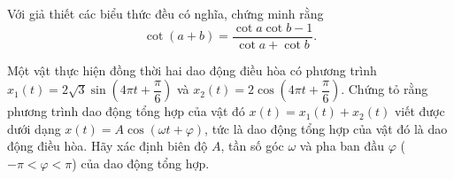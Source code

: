 \begin{bt}[VDT]%
	Với giả thiết các biểu thức đều có nghĩa, chứng minh rằng
	$$\cot (a+b) = \dfrac{\cot a \cot b -1}{\cot a + \cot b}.$$
\end{bt}
\begin{bt}%
	Một vật thực hiện đồng thời hai dao động điều hòa có phương trình $x_1(t) =2\sqrt{3} \sin \left(4\pi t+\dfrac{\pi}{6}\right)$ và $x_2(t) = 2\cos \left(4\pi t+\dfrac{\pi}{6}\right)$. Chứng tỏ rằng phương trình dao động tổng hợp của vật đó $x(t) = x_1(t)+x_2(t)$ viết được dưới dạng $x(t) = A\cos (\omega t + \varphi)$, tức là dao động tổng hợp của vật đó là dao động điều hòa. Hãy xác định biên độ $A$, tần số góc $\omega$ và pha ban đầu $\varphi$ ($-\pi<\varphi<\pi$) của dao động tổng hợp.
\end{bt}
